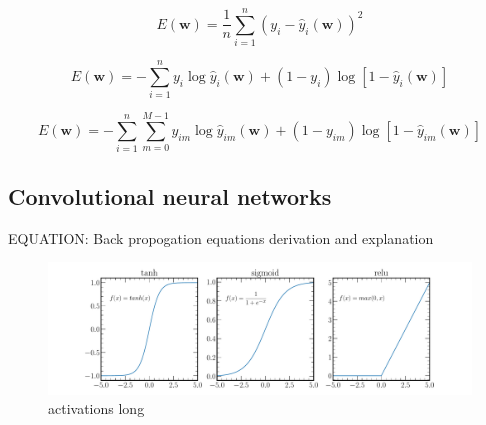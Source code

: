 \begin{equation} %
    E(\boldsymbol{w})=
    \frac{1}{n}\displaystyle\sum_{i=1}^{n}(y_{i}-
    \hat{y}_{i}(\boldsymbol{w}))^{2}
\end{equation}

\begin{equation} %
    E(\boldsymbol{w})=
    -\displaystyle\sum_{i=1}^{n}y_{i}\log\hat{y}_{i}(\boldsymbol{w})+
    (1-y_{i})\log[1-\hat{y}_{i}(\boldsymbol{w})]
\end{equation}

\begin{equation} %
    E(\boldsymbol{w})=
    -\displaystyle\sum_{i=1}^{n}\displaystyle\sum_{m=0}^{M-1}y_{im}\log\hat{y}_{im}
    (\boldsymbol{w})+(1-y_{im})\log[1-\hat{y}_{im}(\boldsymbol{w})]
\end{equation}

\subsection{Convolutional neural networks} %
\label{sec:cvn_theory_conv} %

EQUATION: Back propogation equations derivation and explanation

\begin{figure} %
    \includegraphics[width=\textwidth]{diagrams/7-cvn/activations.pdf}
    \caption[activations short]
    {activations long}
    \label{fig:activations}
\end{figure}


